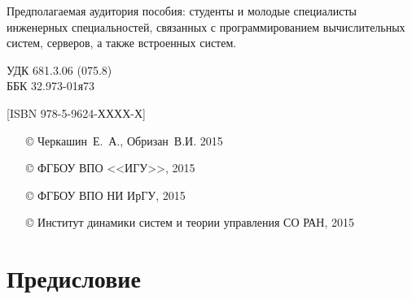 \documentclass[14pt, a4paper, openany, twoside, final]{extbook} %
\newcommand{\e}[2][fcolor]{\textcolor{pcolor}{[}\textcolor{#1}{#2}\textcolor{pcolor}{]}}
\begin{document}
\begin{mygroup}
\begin{minipage}[t]{0.95\linewidth}
Предполагаемая аудитория пособия: студенты и молодые специалисты инженерных специальностей, связанных с программированием вычислительных систем, серверов, а также встроенных систем.

\mbox{}
\endgroup
\end{minipage}
\mbox{}\hspace{0.7\linewidth}
\begin{minipage}{0.3\linewidth}\small
\noindent УДК 681.3.06 (075.8)\\
\noindent ББК 32.973-01я73
\end{minipage}

\vfill
\noindent\begin{minipage}[t]{0.35\linewidth}\small
\noindent \e{ISBN 978-5-9624-ХХХХ-Х}
\end{minipage}%
\begin{minipage}[t]{0.65\linewidth}\small
\begin{itemize}
\setlength{\itemsep}{-0.5ex}
\setlength{\parsep}{0pt}
\item[\copyright{}] Черкашин~Е.~А., Обризан~В.И. 2015
\item[\copyright{}] ФГБОУ ВПО <<ИГУ>>, 2015
\item[\copyright{}] ФГБОУ ВПО НИ ИрГУ, 2015
\item[\copyright{}] Институт динамики систем и теории управления СО РАН, 2015
\end{itemize}
\end{minipage}
\end{mygroup}
\clearpage
\tableofcontents
\clearpage

\newpage
\chapter*{Предисловие}

\end{document}
